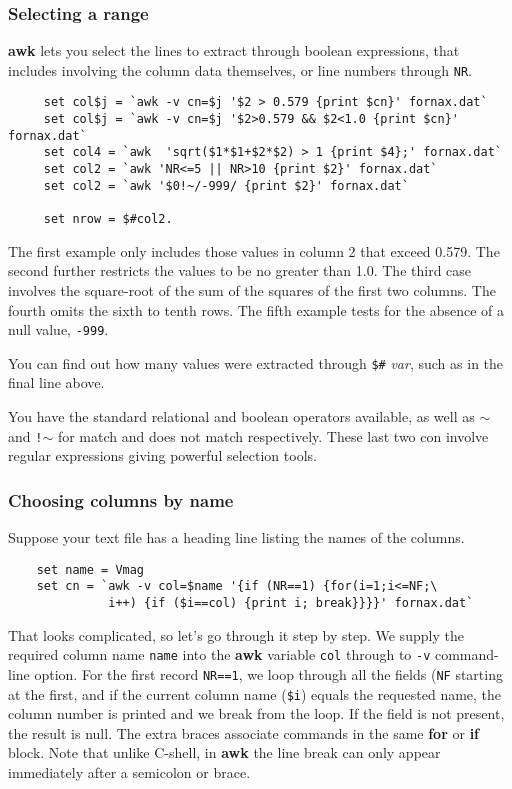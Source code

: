 \documentclass[twoside,11pt]{article}
\newcommand{\htmlref}[2]{#1}
\begin{document}
\subsubsection{Selecting a range}

{\bf awk} lets you select the lines to extract through boolean
expressions, that includes involving the column data themselves, or
line numbers through {\tt NR}.
\small
\begin{verbatim}
     set col$j = `awk -v cn=$j '$2 > 0.579 {print $cn}' fornax.dat`
     set col$j = `awk -v cn=$j '$2>0.579 && $2<1.0 {print $cn}' fornax.dat`
     set col4 = `awk  'sqrt($1*$1+$2*$2) > 1 {print $4};' fornax.dat`
     set col2 = `awk 'NR<=5 || NR>10 {print $2}' fornax.dat`
     set col2 = `awk '$0!~/-999/ {print $2}' fornax.dat`

     set nrow = $#col2.
\end{verbatim}
\normalsize
The first example only includes those values in column 2 that exceed
0.579.  The second further restricts the values to be no greater than 1.0.
The third case involves the square-root of the sum of the squares of
the first two columns.  The fourth omits the sixth to tenth rows.
The fifth example tests for the absence of a null value, {\tt -999}.

You can find out how many values were extracted through {\tt \$\#}{\em
var}, such as in the final line above.

You have the standard \htmlref{relational and boolean operators}{sc4_tab_comp_oper} 
available, as well as {\tt $\sim$} and {\tt !$\sim$} for match and does not match
respectively.  These last two con involve \htmlref{regular expressions}{sc4_gl_reg_exp}
giving powerful selection tools.

\subsubsection{Choosing columns by name}

Suppose your text file has a heading line listing the names of the
columns.
\small
\begin{verbatim}
    set name = Vmag
    set cn = `awk -v col=$name '{if (NR==1) {for(i=1;i<=NF;\
              i++) {if ($i==col) {print i; break}}}}' fornax.dat`
\end{verbatim}
\normalsize
That looks complicated, so let's go through it step by step.  We
supply the required column name {\tt name} into the {\bf awk} variable
{\tt col} through to {\tt -v} command-line option.  For the first
record {\tt NR==1}, we loop through all the fields ({\tt NF} starting
at the first, and if the current column name ({\tt \$i}) equals the
requested name, the column number is printed and we break from the
loop.  If the field is not present, the result is null.  The extra
braces associate commands in the same {\bf for} or {\bf if} block. Note that
unlike C-shell, in {\bf awk} the line break can only appear
immediately after a semicolon or brace.
\end{document}
